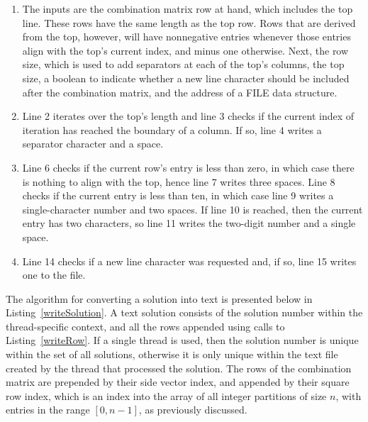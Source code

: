 \begin{enumerate}
\item The inputs are the combination matrix row at hand, which includes the top line. These rows have the same length as the top row. Rows that are derived from the top, however, will have nonnegative entries whenever those entries align with the top's current index, and minus one otherwise. Next, the row size, which is used to add separators at each of the top's columns, the top size, a boolean to indicate whether a new line character should be included after the combination matrix, and the address of a FILE data structure.
\item Line 2 iterates over the top's length and line 3 checks if the current index of iteration has reached the boundary of a column. If so, line 4 writes a separator character and a space.
\addtocounter{enumi}{3}
\pagebreak
\item Line 6 checks if the current row's entry is less than zero, in which case there is nothing to align with the top, hence line 7 writes three spaces. Line 8 checks if the current entry is less than ten, in which case line 9 writes a single-character number and two spaces. If line 10 is reached, then the current entry has two characters, so line 11 writes the two-digit number and a single space.
\addtocounter{enumi}{7}
\item Line 14 checks if a new line character was requested and, if so, line 15 writes one to the file.
\end{enumerate}

The algorithm for converting a solution into text is presented below in Listing~\ref{writeSolution}. A text solution consists of the solution number within the thread-specific context, and all the rows appended using calls to Listing~\ref{writeRow}. If a single thread is used, then the solution number is unique within the set of all solutions, otherwise it is only unique within the text file created by the thread that processed the solution. The rows of the combination matrix are prepended by their side vector index, and appended by their square row index, which is an index into the array of all integer partitions of size $n$, with entries in the range $[0, n - 1]$, as previously discussed.

